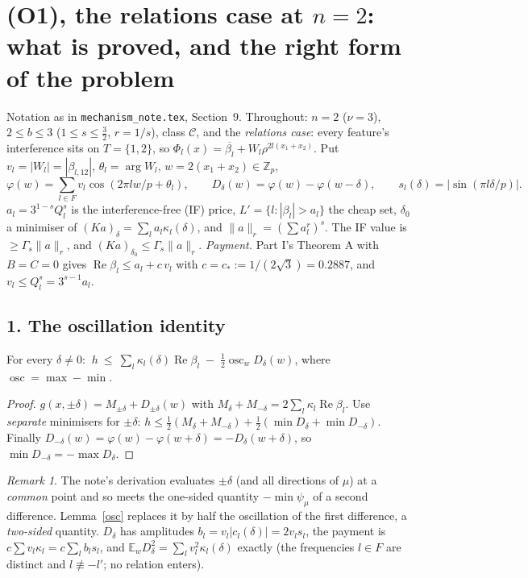 \documentclass[11pt]{article}
\theoremstyle{remark}\newtheorem{remark}[theorem]{Remark}
\renewcommand{\Re}{\operatorname{Re}}\newcommand{\osc}{\operatorname{osc}}
\begin{document}
\section*{(O1), the relations case at $n=2$: what is proved, and the right form of the problem}
Notation as in \texttt{mechanism\_note.tex}, Section~9.  Throughout: $n=2$ ($\nu=3$), $2\le b\le3$ ($1\le s\le\frac32$, $r=1/s$),
class $\mathcal C$, and the \emph{relations case}: every feature's interference sits on $T=\{1,2\}$, so
$\Phi_l(x)=\overline{\beta_l}+W_l\rho^{2l(x_1+x_2)}$.  Put $v_l=|W_l|=|\beta_{l,12}|$, $\theta_l=\arg W_l$, $w=2(x_1+x_2)\in\mathbb Z_p$,
\[\varphi(w)=\sum_{l\in F}v_l\cos(2\pi lw/p+\theta_l),\qquad D_\delta(w)=\varphi(w)-\varphi(w-\delta),\qquad s_l(\delta)=|\sin(\pi l\delta/p)| .\]
$a_l=3^{1-s}Q_l^s$ is the interference-free (IF) price, $L'=\{l:|\beta_l|>a_l\}$ the cheap set, $\delta_0$ a minimiser of $(Ka)_\delta=\sum_la_l\kappa_l(\delta)$,
and $\|a\|_r=(\sum a_l^r)^{s}$.  The IF value is $\ge\Gamma_s\|a\|_r$, and $(Ka)_{\delta_0}\le\Gamma_s\|a\|_r$.
\emph{Payment.}  Part I's Theorem A with $B=C=0$ gives $\Re\beta_l\le a_l+c\,v_l$ with $c=c_*:=1/(2\sqrt3)=0.2887$, and $v_l\le Q_l^s=3^{s-1}a_l$.

\subsection*{1. The oscillation identity}
\begin{lemma}\label{osc}
For every $\delta\ne0$: $\ h\ \le\ \sum_l\kappa_l(\delta)\Re\beta_l\;-\;\tfrac12\osc_w D_\delta(w)$, where $\osc=\max-\min$.
\end{lemma}
\begin{proof}
$g(x,\pm\delta)=M_{\pm\delta}+D_{\pm\delta}(w)$ with $M_\delta+M_{-\delta}=2\sum_l\kappa_l\Re\beta_l$.  Use \emph{separate} minimisers for $\pm\delta$:
$h\le\frac12(M_\delta+M_{-\delta})+\frac12(\min D_\delta+\min D_{-\delta})$.  Finally $D_{-\delta}(w)=\varphi(w)-\varphi(w+\delta)=-D_\delta(w+\delta)$,
so $\min D_{-\delta}=-\max D_\delta$.
\end{proof}
\begin{remark}
The note's derivation evaluates $\pm\delta$ (and all directions of $\mu$) at a \emph{common} point and so meets the one-sided
quantity $-\min\psi_\mu$ of a second difference.  Lemma~\ref{osc} replaces it by half the oscillation of the first difference, a
\emph{two-sided} quantity.  $D_\delta$ has amplitudes $b_l=v_l|c_l(\delta)|=2v_ls_l$, the payment is $c\sum v_l\kappa_l=c\sum_lb_ls_l$, and
$\mathbb E_wD_\delta^2=\sum_lv_l^2\kappa_l(\delta)$ exactly (the frequencies $l\in F$ are distinct and $l\not\equiv-l'$; no relation enters).
\end{remark}
\end{document}
